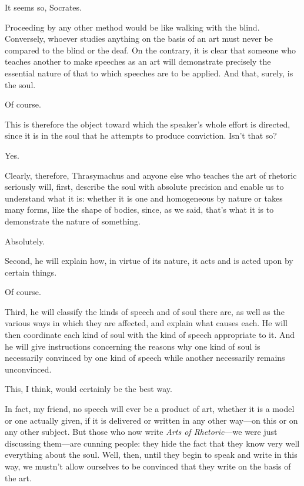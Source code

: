 \sayphaedrus It seems so, Socrates.

\saysocrates Proceeding by any other method would be like walking with 
the blind. Conversely, whoever studies anything on the basis of
an art must never be compared to the blind or the deaf. On the contrary,
it is clear that someone who teaches another to make speeches as an art
will demonstrate precisely the essential nature of that to which
speeches are to be applied. And that, surely, is the soul.

\sayphaedrus Of course.

\saysocrates This is therefore the object toward which the speaker's whole effort is directed, since it is in the soul that he
attempts to produce conviction. Isn't that so?

\sayphaedrus Yes.

\saysocrates Clearly, therefore, Thrasymachus and anyone else who teaches
the art of rhetoric seriously will, first, describe the soul with
absolute precision and enable us to understand what it is: whether it is
one and homogeneous by nature or takes many forms, like the shape of
bodies, since, as we said, that's what it is to demonstrate the nature
of something.

\sayphaedrus Absolutely.

\saysocrates Second, he will explain how, in virtue of its nature, it acts
and is acted upon by certain things.

\sayphaedrus Of course.

\saysocrates Third, he will classify the kinds of speech and of
soul there are, as well as the various ways in which they are affected,
and explain what causes each. He will then coordinate each kind of soul
with the kind of speech appropriate to it. And he will give instructions
concerning the reasons why one kind of soul is necessarily convinced by
one kind of speech while another necessarily remains unconvinced.

\sayphaedrus This, I think, would certainly be the best way.

\saysocrates In fact, my friend, no speech will ever be a product of art,
whether it is a model or one actually given, if it is delivered or
written in any other way---on this or on any other subject. But
those who now write {\em Arts of Rhetoric}---we were just discussing
them---are cunning people: they hide the fact that they know very well
everything about the soul. Well, then, until they begin to speak and
write in this way, we mustn't allow ourselves to be convinced that they
write on the basis of the art.

